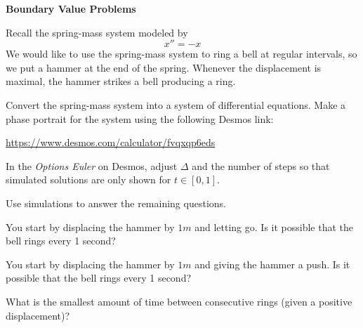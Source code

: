 \documentclass{workbook}
\begin{document}
\begin{slide}
	\textbf{Boundary Value Problems}

	\question
	Recall the spring-mass system modeled by
	\[
		x''=-x
	\]
	We would like to use the spring-mass system to ring a bell at regular intervals, 
	so we put a hammer at the end of the spring. Whenever the displacement is maximal,
	the hammer strikes a bell producing a ring.

	\begin{parts}
		\item Convert the spring-mass system into a system of differential equations.
		Make a phase portrait for the system using the following Desmos link:

		{\small \url{https://www.desmos.com/calculator/fvqxqp6eds}}
		\item In the \emph{Options Euler} on Desmos, adjust $\Delta$ and the number of steps so that simulated solutions are only 
		shown for $t\in[0,1]$.

		Use simulations to answer the remaining questions.
		\item You start by displacing the hammer by $1m$ and letting go. Is it possible that the bell rings every 1 second?
		\item You start by displacing the hammer by $1m$ and giving the hammer a push. Is it possible that the bell rings every 1 second?
		\item What is the smallest amount of time between consecutive rings (given a positive displacement)?
	\end{parts}
\end{slide}
\end{document}
